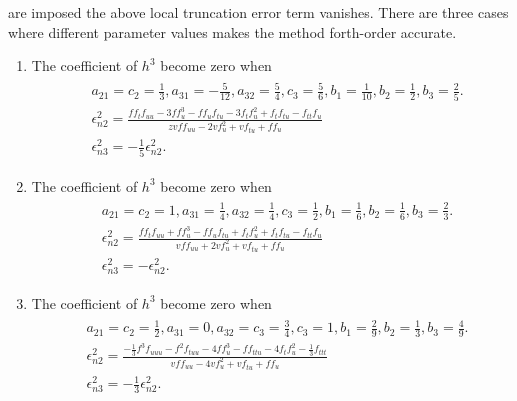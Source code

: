 \documentclass[a4paper, preprint,11pt]{elsarticle}
\numberwithin{equation}{section}
\begin{document}
 are imposed the above local truncation error term vanishes. There are three cases where different parameter values makes the method forth-order accurate.
 \begin{enumerate}[label=\Roman*.]
\item The coefficient of $h^3$ become zero when
\begin{eqnarray*}
\begin{aligned}
& a_{21} = c_2 = \frac{1}{3}, 
a_{31} = -\frac{5}{12}, 
a_{32} = \frac{5}{4}, 
c_3 = \frac{5}{6}, 
b_1 = \frac{1}{10}, 
b_2 = \frac{1}{2}, 
b_3 = \frac{2}{5}.\\
& \epsilon^2_{n2} =\frac{
f f_t f_{uu}
- 3 f f_u^3
- f f_u f_{tu}
- 3 f_t f_u^2
+ f_t f_{tu}
- f_{tt} f_u
}{z
v f f_{uu}
- 2v f_u^2
+ v f_{tu}
+ f f_u
}\\
& \epsilon^2_{n3} = -\frac{1}{5}\epsilon^2_{n2}.
\end{aligned}
\end{eqnarray*}

\item  The coefficient of $h^3$ become zero when 
\begin{eqnarray*}
\begin{aligned}
    & a_{21} = c_2 = 1, 
a_{31} = \frac{1}{4}, 
a_{32} = \frac{1}{4}, 
c_3 = \frac{1}{2}, 
b_1 = \frac{1}{6}, b_2 = \frac{1}{6}, 
b_3 = \frac{2}{3}.\\
& \epsilon^2_{n2} =
\frac{
f f_t f_{uu}
+ f f_u^3
- f f_u f_{tu}
+ f_t f_u^2
+ f_t f_{tu}
- f_{tt} f_u
}{
v f f_{uu}
+ 2v f_u^2
+ v f_{tu}
+ f f_u
}\\
& \epsilon^2_{n3} = -\epsilon^2_{n2}.
\end{aligned}    
\end{eqnarray*}

\item The coefficient of $h^3$ become zero when
\begin{eqnarray*}
\begin{aligned}
& a_{21} = c_2 = \frac{1}{2}, 
a_{31} = 0, 
a_{32} = c_3 = \frac{3}{4},
c_3 = 1, 
b_1 = \frac{2}{9}, 
b_2 = \frac{1}{3}, 
b_3 = \frac{4}{9}.\\
& \epsilon^2_{n2} = 
\frac{
-\frac{1}{3} f^3 f_{uuu}
- f^2 f_{tuu}
- 4f f_u^3
- f f_{ttu}
- 4f_t f_u^2
- \frac{1}{3} f_{ttt}
}{
v f f_{uu}
- 4v f_u^2
+ v f_{tu}
+ f f_u
}\\
& \epsilon^2_{n3} = -\frac{1}{3}\epsilon^2_{n2}.
\end{aligned}
\end{eqnarray*}
\end{enumerate}
\end{document}

